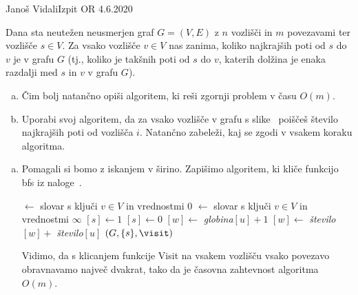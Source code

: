 \begin{naloga}{Janoš Vidali}{Izpit OR 4.6.2020}
\begin{vprasanje}
Dana sta neutežen neusmerjen graf $G = (V, E)$
z $n$ vozlišči in $m$ povezavami
ter vozlišče $s \in V$.
Za vsako vozlišče $v \in V$ nas zanima,
koliko najkrajših poti od $s$ do $v$ je v grafu $G$
(tj., koliko je takšnih poti od $s$ do $v$,
katerih dolžina je enaka razdalji med $s$ in $v$ v grafu $G$).

\begin{enumerate}[(a)]
\item Čim bolj natančno opiši algoritem,
ki reši zgornji problem v času $O(m)$.

\item Uporabi svoj algoritem,
da za vsako vozlišče v grafu s slike~\fig
poiščeš število najkrajših poti od vozlišča $i$.
Natančno zabeleži, kaj se zgodi v vsakem koraku algoritma.
\end{enumerate}

\begin{slika}
\pgfslika
{}
\end{slika}
\end{vprasanje}

\begin{odgovor}
\begin{enumerate}[(a)]
\item Pomagali si bomo z iskanjem v širino.
Zapišimo algoritem, ki kliče funkcijo {\sc bfs} iz naloge~\res[bfs].
\begin{small}
\begin{algorithmic}
	 $\gets$ slovar s ključi $v \in V$
                                 in vrednostmi $0$
	 $\gets$ slovar s ključi $v \in V$
                                 in vrednostmi $\infty$
    $[s] \gets 1$
    $[s] \gets 0$
                $[w] \gets$ {\sl globina}$[u] + 1$
            \EndIf
                $[w] \gets$ {\sl število}$[w] +$ {\sl število}$[u]$
            \EndIf
        \EndFor
	\EndFunction
	$(G, \{s\}, \visit)$
	\State {}
\EndFunction
\end{algorithmic}
\end{small}
Vidimo,
da s klicanjem funkcije {\sc Visit} na vsakem vozlišču
vsako povezavo obravnavamo največ dvakrat,
tako da je časovna zahtevnost algoritma $O(m)$.


\end{enumerate}
\end{odgovor}
\end{naloga}
